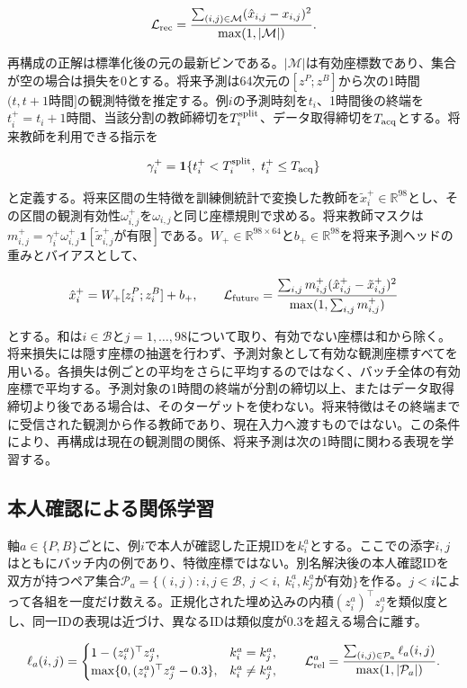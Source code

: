 \[
\mathcal L_{\rm rec}=\frac{\sum_{(i,j)\in\mathcal M}(\hat x_{i,j}-x_{i,j})^2}{\max(1,|\mathcal M|)}.
\]

再構成の正解は標準化後の元の最新ビンである。\(|\mathcal M|\)は有効座標数であり、集合が空の場合は損失を0とする。将来予測は64次元の\([z^P;z^B]\)から次の1時間\((t,t+1\text{時間}]\)の観測特徴を推定する。例\(i\)の予測時刻を\(t_i\)、1時間後の終端を\(t_i^+=t_i+1\text{時間}\)、当該分割の教師締切を\(T_i^{\rm split}\)、データ取得締切を\(T_{\rm acq}\)とする。将来教師を利用できる指示を

\[
\gamma_i^+=\mathbf1\{t_i^+<T_i^{\rm split},\ t_i^+\le T_{\rm acq}\}
\]

と定義する。将来区間の生特徴を訓練側統計で変換した教師を\(\tilde x_i^+\in\mathbb R^{98}\)とし、その区間の観測有効性\(\omega_{i,j}^+\)を\(\omega_{i,j}\)と同じ座標規則で求める。将来教師マスクは\(m_{i,j}^+=\gamma_i^+\omega_{i,j}^+\mathbf1[\tilde x_{i,j}^+\text{が有限}]\)である。\(W_+\in\mathbb R^{98\times64}\)と\(b_+\in\mathbb R^{98}\)を将来予測ヘッドの重みとバイアスとして、

\[
\hat x_i^+=W_+[z_i^P;z_i^B]+b_+,\qquad
\mathcal L_{\rm future}=\frac{\sum_{i,j}m_{i,j}^+(\hat x_{i,j}^+-\tilde x_{i,j}^+)^2}{\max(1,\sum_{i,j}m_{i,j}^+)}
\]

とする。和は\(i\in\mathcal B\)と\(j=1,\ldots,98\)について取り、有効でない座標は和から除く。将来損失には隠す座標の抽選を行わず、予測対象として有効な観測座標すべてを用いる。各損失は例ごとの平均をさらに平均するのではなく、バッチ全体の有効座標で平均する。予測対象の1時間の終端が分割の締切以上、またはデータ取得締切より後である場合は、そのターゲットを使わない。将来特徴はその終端までに受信された観測から作る教師であり、現在入力へ渡すものではない。この条件により、再構成は現在の観測間の関係、将来予測は次の1時間に関わる表現を学習する。

\subsection{本人確認による関係学習}

軸\(a\in\{P,B\}\)ごとに、例\(i\)で本人が確認した正規IDを\(k_i^a\)とする。ここでの添字\(i,j\)はともにバッチ内の例であり、特徴座標ではない。別名解決後の本人確認IDを双方が持つペア集合\(\mathcal P_a=\{(i,j):i,j\in\mathcal B,\ j<i,\ k_i^a,k_j^a\text{が有効}\}\)を作る。\(j<i\)によって各組を一度だけ数える。正規化された埋め込みの内積\((z_i^a)^\top z_j^a\)を類似度とし、同一IDの表現は近づけ、異なるIDは類似度が0.3を超える場合に離す。

\[
\ell_a(i,j)=
\begin{cases}
1-(z_i^a)^\top z_j^a,& k_i^a=k_j^a,\\
\max\{0,(z_i^a)^\top z_j^a-0.3\},& k_i^a\ne k_j^a,
\end{cases}
\qquad
\mathcal L_{\rm rel}^{a}=\frac{\sum_{(i,j)\in\mathcal P_a}\ell_a(i,j)}{\max(1,|\mathcal P_a|)}.
\]

